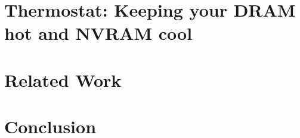 \documentclass[reqno,12pt,oneside]{umdiss2-proposal} %
\theoremstyle{plain}
\theoremstyle{definition}
\theoremstyle{remark}
\numberwithin{theorem}{chapter}     %
\begin{document}
% 

 \chapter{Thermostat: Keeping your DRAM hot and NVRAM cool}
 \label{chap:thermostat}
 

 \chapter{Related Work}
 \label{chap:related}
 

 \chapter{Conclusion}
 \label{chap:conclusion}
 

% 

% 
 
 \begin{singlespace} %
 \end{singlespace}

%
\end{document}
